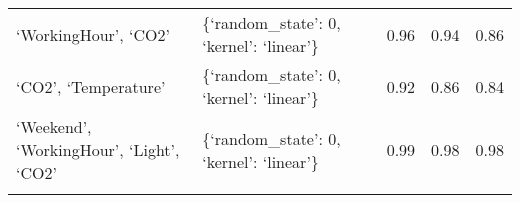 \documentclass[11pt]{article}
\begin{document}
\begin{longtable}[]{@{}lllll@{}}
\begin{minipage}[t]{0.34\columnwidth}\raggedright
`WorkingHour', `CO2'\strut
\end{minipage} & \begin{minipage}[t]{0.33\columnwidth}\raggedright
\{`random\_state': 0, `kernel': `linear'\}\strut
\end{minipage} & \begin{minipage}[t]{0.06\columnwidth}\raggedright
0.96\strut
\end{minipage} & \begin{minipage}[t]{0.06\columnwidth}\raggedright
0.94\strut
\end{minipage} & \begin{minipage}[t]{0.06\columnwidth}\raggedright
0.86\strut
\end{minipage}\tabularnewline
\begin{minipage}[t]{0.34\columnwidth}\raggedright
`CO2', `Temperature'\strut
\end{minipage} & \begin{minipage}[t]{0.33\columnwidth}\raggedright
\{`random\_state': 0, `kernel': `linear'\}\strut
\end{minipage} & \begin{minipage}[t]{0.06\columnwidth}\raggedright
0.92\strut
\end{minipage} & \begin{minipage}[t]{0.06\columnwidth}\raggedright
0.86\strut
\end{minipage} & \begin{minipage}[t]{0.06\columnwidth}\raggedright
0.84\strut
\end{minipage}\tabularnewline
\begin{minipage}[t]{0.34\columnwidth}\raggedright
`Weekend', `WorkingHour', `Light', `CO2'\strut
\end{minipage} & \begin{minipage}[t]{0.33\columnwidth}\raggedright
\{`random\_state': 0, `kernel': `linear'\}\strut
\end{minipage} & \begin{minipage}[t]{0.06\columnwidth}\raggedright
0.99\strut
\end{minipage} & \begin{minipage}[t]{0.06\columnwidth}\raggedright
0.98\strut
\end{minipage} & \begin{minipage}[t]{0.06\columnwidth}\raggedright
0.98\strut
\end{minipage}\tabularnewline
\begin{minipage}[t]{0.34\columnwidth}\raggedright

\end{minipage}
\end{longtable}
\end{document}
